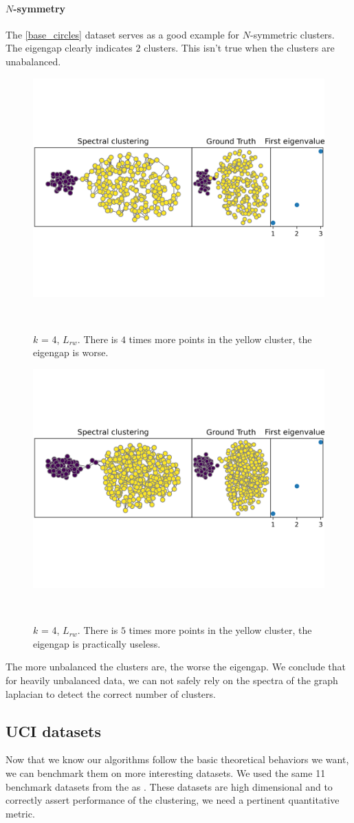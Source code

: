 \documentclass[a4paper,12pt]{article}
\theoremstyle{definition}
\theoremstyle{plain}
\begin{document}
\paragraph{$N$-symmetry}
The \ref{base_circles} dataset serves as a good example for $N$-symmetric clusters. The eigengap clearly indicates $2$ clusters.
This isn't true when the clusters are unabalanced.

\begin{figure}[H]
	\centering
	\includegraphics[width=0.6\linewidth]{figures/4x_asym_blobs_rw}
	\label{fig:mid_asym_blobs_rw}
	\caption{$k$ = 4, $L_{rw}$. There is $4$ times more points in the yellow cluster, the eigengap is worse.}\\
\end{figure}

\begin{figure}[H]
	\centering
	\includegraphics[width=0.6\linewidth]{figures/mid_asym_blobs_rw}
	\label{fig:4x_asym_blobs_rw}
	\caption{$k$ = 4, $L_{rw}$. There is $5$ times more points in the yellow cluster, the eigengap is practically useless.}\\
\end{figure}
The more unbalanced the clusters are, the worse the eigengap. We conclude that for heavily unbalanced data, we can not safely rely on the spectra of the graph laplacian to detect the correct number of clusters.
\subsection{UCI datasets}
Now that we know our algorithms follow the basic theoretical behaviors we want, we can benchmark them on more interesting datasets.
We used the same 11 benchmark datasets from the \cite[UCI ML repository]{UCI} as \cite[Jonckheere et.al]{GSC}. These datasets are high dimensional and to correctly assert performance of the clustering, we need a pertinent quantitative metric.
\end{document}
